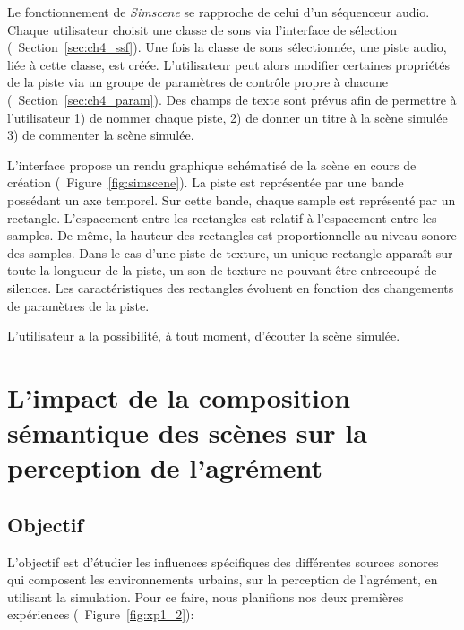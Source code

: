 Le fonctionnement de \emph{Simscene} se rapproche de celui d'un séquenceur audio. Chaque utilisateur choisit une classe de sons via l'interface de sélection (\cf~Section~\ref{sec:ch4_ssf}). Une fois la classe de sons sélectionnée, une piste audio, liée à cette classe, est créée. L'utilisateur peut alors modifier certaines propriétés de la piste via un groupe de paramètres de contrôle propre à chacune (\cf~Section~\ref{sec:ch4_param}). Des champs de texte sont prévus afin de permettre à l'utilisateur 1) de nommer chaque piste, 2) de donner un titre à la scène simulée 3) de commenter la scène simulée.

L'interface propose un rendu graphique schématisé de la scène en cours de création (\cf~Figure~\ref{fig:simscene}). La piste est représentée par une bande possédant un axe temporel. Sur cette bande, chaque sample est représenté par un rectangle. L'espacement entre les rectangles est relatif à l'espacement entre les samples. De même, la hauteur des rectangles est proportionnelle au niveau sonore des samples. Dans le cas d'une piste de texture, un unique rectangle apparaît sur toute la longueur de la piste, un son de texture ne pouvant être entrecoupé de silences. Les caractéristiques des rectangles évoluent en fonction des changements de paramètres de la piste.

L'utilisateur a la possibilité, à tout moment, d'écouter la scène simulée.
 

\section[Agrément perçu et composition sémantique]{L'impact de la composition sémantique des scènes sur la perception de l'agrément}
\label{sec:xp1_2}

\subsection{Objectif}

L'objectif est d'étudier les influences spécifiques des différentes sources sonores qui composent les environnements urbains, sur la perception de l'agrément, en utilisant la simulation. Pour ce faire, nous planifions nos deux premières expériences (\cf~Figure~\ref{fig:xp1_2}):

